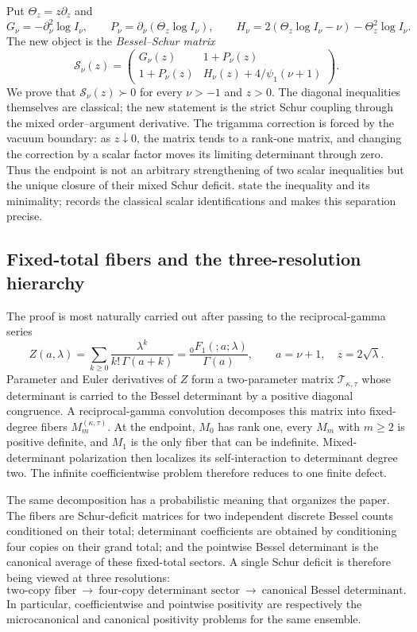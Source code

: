\documentclass[11pt,a4paper]{amsart}
\numberwithin{equation}{section}
\theoremstyle{plain}
\theoremstyle{definition}
\newcommand{\Turan}{\mathcal T}
\newcommand{\Thetaz}{\Theta_z}
\begin{document}
Put \(\Thetaz=z\partial_z\) and
\[
 G_\nu=-\partial_\nu^2\log I_\nu,\qquad
 P_\nu=\partial_\nu(\Thetaz\log I_\nu),\qquad
 H_\nu=2(\Thetaz\log I_\nu-\nu)-\Thetaz^2\log I_\nu.
\]
The new object is the \emph{Bessel--Schur matrix}
\begin{equation}\label{eq:intro-schur-matrix}
 \mathcal S_\nu(z)=
 \begin{pmatrix}
  G_\nu(z)&1+P_\nu(z)\\
  1+P_\nu(z)&H_\nu(z)+4/\psi_1(\nu+1)
 \end{pmatrix}.
\end{equation}
We prove that \(\mathcal S_\nu(z)\succ0\) for every \(\nu>-1\) and \(z>0\).
The diagonal inequalities themselves are classical; the new statement is the
strict Schur coupling through the mixed order--argument derivative.  The
trigamma correction is forced by the vacuum boundary: as \(z\downarrow0\),
the matrix tends to a rank-one matrix, and changing the correction by a scalar
factor moves its limiting determinant through zero.  Thus the endpoint is not
an arbitrary strengthening of two scalar inequalities but the unique closure
of their mixed Schur deficit.   state
the inequality and its minimality;  records the classical
scalar identifications and makes this separation precise.

\subsection{Fixed-total fibers and the three-resolution hierarchy}\label{subsec:intro-hierarchy}

The proof is most naturally carried out after passing to the reciprocal-gamma series
\[
 Z(a,\lambda)=\sum_{k\ge0}\frac{\lambda^k}{k!\,\Gamma(a+k)}
 =\frac{{}_0F_1(;a;\lambda)}{\Gamma(a)},
 \qquad a=\nu+1,\quad z=2\sqrt\lambda.
\]
Parameter and Euler derivatives of \(Z\) form a two-parameter matrix
\(\Turan_{\kappa,\tau}\) whose determinant is carried to the Bessel determinant
by a positive diagonal congruence.  A reciprocal-gamma convolution decomposes
this matrix into fixed-degree fibers \(M_m^{(\kappa,\tau)}\).  At the endpoint,
\(M_0\) has rank one, every \(M_m\) with \(m\ge2\) is positive definite, and
\(M_1\) is the only fiber that can be indefinite.  Mixed-determinant
polarization then localizes its self-interaction to determinant degree two.
The infinite coefficientwise problem therefore reduces to one finite defect.

The same decomposition has a probabilistic meaning that organizes the paper.
The fibers are Schur-deficit matrices for two independent discrete Bessel
counts conditioned on their total; determinant coefficients are obtained by
conditioning four copies on their grand total; and the pointwise Bessel
determinant is the canonical average of these fixed-total sectors.  A single
Schur deficit is therefore being viewed at three resolutions:
\[
 \text{two-copy fiber}\ \longrightarrow\
 \text{four-copy determinant sector}\ \longrightarrow\
 \text{canonical Bessel determinant}.
\]
In particular, coefficientwise and pointwise positivity are respectively the
microcanonical and canonical positivity problems for the same ensemble.
\end{document}

